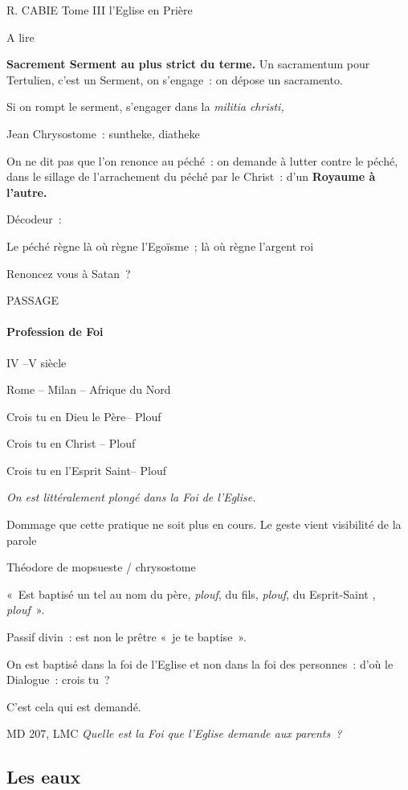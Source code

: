 R. CABIE Tome III l'Eglise en Prière

A lire

\textbf{Sacrement Serment au plus strict du terme.} Un sacramentum pour
Tertulien, c'est un Serment, on s'engage~: on dépose un sacramento.

Si on rompt le serment, s'engager dans la \emph{militia christi,}

Jean Chrysostome~: suntheke, diatheke

On ne dit pas que l'on renonce au péché~: on demande à lutter contre le
péché, dans le sillage de l'arrachement du péché par le Christ~: d'un
\textbf{Royaume à l'autre.}

Décodeur~:

Le péché règne là où règne l'Egoïsme~; là où règne l'argent roi

Renoncez vous à Satan~?

PASSAGE

\hypertarget{profession-de-foi}{%
\paragraph{Profession de Foi}\label{profession-de-foi}}

IV --V siècle

Rome -- Milan -- Afrique du Nord

 
Crois tu en Dieu le Père-- Plouf

Crois tu en Christ -- Plouf

Crois tu en l'Esprit Saint-- Plouf
 

\emph{On est littéralement plongé dans la Foi de l'Eglise.}

Dommage que cette pratique ne soit plus en cours. Le geste vient
visibilité de la parole

Théodore de mopsueste / chrysostome

«~Est baptisé un tel au nom du père, \emph{plouf}, du fils,
\emph{plouf}, du Esprit-Saint , \emph{plouf}~».

Passif divin~: est non le prêtre «~je te baptise~».

On est baptisé dans la foi de l'Eglise et non dans la foi des
personnes~: d'où le Dialogue~: crois tu~?

C'est cela qui est demandé.

MD 207, LMC \emph{Quelle est la Foi que l'Eglise demande aux parents~?}

\hypertarget{les-eaux}{%
\subsection{Les eaux}\label{les-eaux}}


